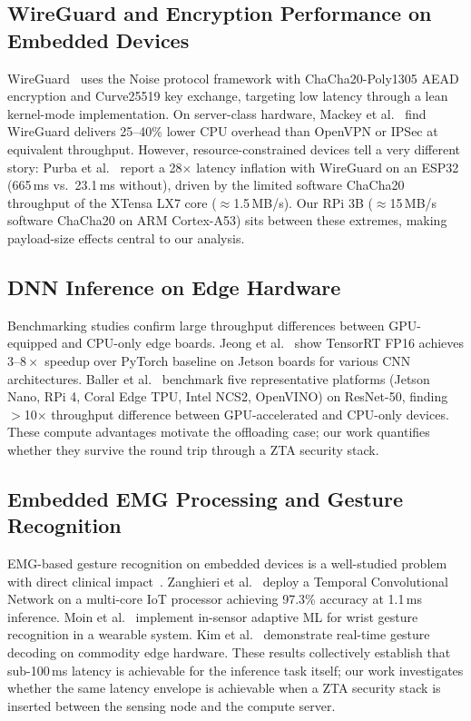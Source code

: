 \documentclass[10pt,twocolumn]{article}
\begin{document}
\subsection{WireGuard and Encryption Performance on Embedded Devices}

WireGuard~\cite{wireguard} uses the Noise protocol framework with
ChaCha20-Poly1305 AEAD encryption and Curve25519 key exchange, targeting
low latency through a lean kernel-mode implementation.  On server-class
hardware, Mackey et al.~\cite{mackey2020wg} find WireGuard delivers 25--40\%
lower CPU overhead than OpenVPN or IPSec at equivalent throughput.  However,
resource-constrained devices tell a very different story: Purba
et al.~\cite{purba2025wg} report a 28$\times$ latency inflation with
WireGuard on an ESP32 (665\,ms vs.\ 23.1\,ms without), driven by the limited
software ChaCha20 throughput of the XTensa LX7 core ($\approx$1.5\,MB/s).
Our RPi 3B ($\approx$15\,MB/s software ChaCha20 on ARM Cortex-A53) sits
between these extremes, making payload-size effects central to our analysis.

\subsection{DNN Inference on Edge Hardware}

Benchmarking studies confirm large throughput differences between
GPU-equipped and CPU-only edge boards.  Jeong et al.~\cite{jeong2022tensorrt}
show TensorRT FP16 achieves $3$--$8\times$ speedup over PyTorch baseline on
Jetson boards for various CNN architectures.  Baller
et al.~\cite{baller2021deepedgebench} benchmark five representative platforms
(Jetson Nano, RPi 4, Coral Edge TPU, Intel NCS2, OpenVINO)
on ResNet-50, finding $>$10$\times$ throughput difference between
GPU-accelerated and CPU-only devices.  These compute advantages motivate the
offloading case; our work quantifies whether they survive the round trip
through a ZTA security stack.

\subsection{Embedded EMG Processing and Gesture Recognition}

EMG-based gesture recognition on embedded devices is a well-studied problem
with direct clinical impact~\cite{zanghieri2019tcn, moin2020wearable,
kim2023emg}.  Zanghieri et al.~\cite{zanghieri2019tcn} deploy a Temporal
Convolutional Network on a multi-core IoT processor achieving 97.3\% accuracy
at 1.1\,ms inference.  Moin et al.~\cite{moin2020wearable} implement
in-sensor adaptive ML for wrist gesture recognition in a wearable system.
Kim et al.~\cite{kim2023emg} demonstrate real-time gesture decoding on
commodity edge hardware.  These results collectively establish that
sub-100\,ms latency is achievable for the inference task itself; our work
investigates whether the same latency envelope is achievable when a ZTA
security stack is inserted between the sensing node and the compute server.
\end{document}
